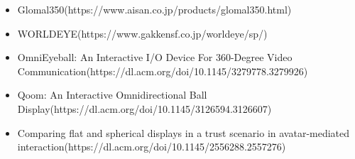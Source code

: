 \begin{itemize}
  \item Glomal350(https://www.aisan.co.jp/products/glomal350.html)
  \item WORLDEYE(https://www.gakkensf.co.jp/worldeye/sp/)
  \item OmniEyeball: An Interactive I/O Device For 360-Degree Video Communication(https://dl.acm.org/doi/10.1145/3279778.3279926)
  \item Qoom: An Interactive Omnidirectional Ball Display(https://dl.acm.org/doi/10.1145/3126594.3126607)
  \item Comparing flat and spherical displays in a trust scenario in avatar-mediated interaction(https://dl.acm.org/doi/10.1145/2556288.2557276)
\end{itemize}